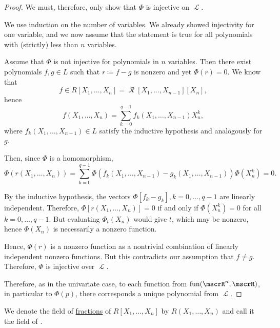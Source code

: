 \begin{proof}
  We must, therefore, only show that \( \Phi \) is injective on \( \mscrL \).

  We use induction on the number of variables. We already showed injectivity for one variable, and we now assume that the statement is true for all polynomials with (strictly) less than \( n \) variables.

  Assume that \( \Phi \) is not injective for polynomials in \( n \) variables. Then there exist polynomials \( f, g \in L \) such that \( r \coloneqq f - g \) is nonzero and yet \( \Phi(r) = 0 \). We know that
  \begin{equation*}
    f \in R[X_1, \ldots, X_n] = \mscrR[X_1, \ldots, X_{n-1}][X_n],
  \end{equation*}
  hence
  \begin{equation*}
    f(X_1, \ldots, X_n) = \sum_{k=0}^{q-1} f_k(X_1, \ldots, X_{n-1}) X_n^k,
  \end{equation*}
  where \( f_k(X_1, \ldots, X_{n-1}) \in L \) satisfy the inductive hypothesis and analogously for \( g \).

  Then, since \( \Phi \) is a homomorphism,
  \begin{equation*}
    \Phi(r(X_1, \ldots, X_n)) = \sum_{k=0}^{q-1} \Phi(f_k(X_1, \ldots, X_{n-1}) - g_k(X_1, \ldots, X_{n-1})) \Phi(X_n^k) = 0.
  \end{equation*}

  By the inductive hypothesis, the vectors \( \Phi[f_k - g_k], k = 0, \ldots, q - 1 \) are linearly independent. Therefore, \( \Phi[r(X_1, \ldots, X_n)] = 0 \) if and only if \( \Phi(X_n^k) = 0 \) for all \( k = 0, \ldots, q - 1 \). But evaluating \( \Phi_t(X_n) \) would give \( t \), which may be nonzero, hence \( \Phi(X_n) \) is necessarily a nonzero function.

  Hence, \( \Phi(r) \) is a nonzero function as a nontrivial combination of linearly independent nonzero functions. But this contradicts our assumption that \( f \neq g \). Therefore, \( \Phi \) is injective over \( \mscrL \).

  Therefore, as in the univariate case, to each function from \( \fun(\mscrR^n, \mscrR) \), in particular to \( \Phi(p) \), there corresponds a unique polynomial from \( \mscrL \).
\end{proof}

\begin{definition}\label{def:rational_algebraic_function}
  We denote the field of \hyperref[def:field_of_fractions]{fractions} of \( R[X_1, \ldots, X_n] \) by \( R(X_1, \ldots, X_n) \) and call it the field of .
\end{definition}

